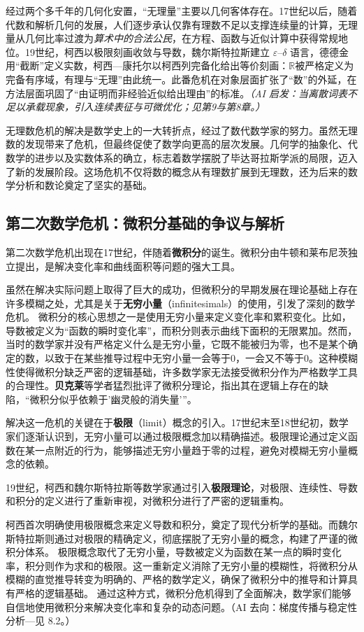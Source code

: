 经过两个多千年的几何化安置，“无理量”主要以几何客体存在。17世纪以后，随着代数和解析几何的发展，人们逐步承认仅靠有理数不足以支撑连续量的计算，无理量从几何比率过渡为{\itshape 算术中的合法公民}，在方程、函数与近似计算中获得常规地位。19世纪，柯西以极限刻画收敛与导数，魏尔斯特拉斯建立 $\varepsilon$–$\delta$ 语言，德德金用“截断”定义实数，柯西—康托尔以柯西列完备化给出等价刻画：$\mathbb{R}$被严格定义为完备有序域，有理与“无理”由此统一。此番危机在对象层面扩张了“数”的外延，在方法层面巩固了“由证明而非经验近似给出理由”的标准。{\itshape（AI 启发：当离散词表不足以承载现象，引入连续表征与可微优化；见第9与第8章。）}

无理数危机的解决是数学史上的一大转折点，经过了数代数学家的努力。虽然无理数的发现带来了危机，但最终促使了数学向更高的层次发展。几何学的抽象化、代数学的进步以及实数体系的确立，标志着数学摆脱了毕达哥拉斯学派的局限，迈入了新的发展阶段。这场危机不仅将数的概念从有理数扩展到无理数，还为后来的数学分析和数论奠定了坚实的基础。

\subsection{第二次数学危机：微积分基础的争议与解析}
第二次数学危机出现在17世纪，伴随着{\bf 微积分}的诞生。微积分由牛顿和莱布尼茨独立提出，是解决变化率和曲线面积等问题的强大工具。

虽然在解决实际问题上取得了巨大的成功，但微积分的早期发展在理论基础上存在许多模糊之处，尤其是关于{\bf 无穷小量}（infinitesimals）的使用，引发了深刻的数学危机。
微积分的核心思想之一是使用无穷小量来定义变化率和累积变化。比如，导数被定义为“函数的瞬时变化率”，而积分则表示曲线下面积的无限累加。然而，当时的数学家并没有严格定义什么是无穷小量，它既不能被归为零，也不是某个确定的数，以致于在某些推导过程中无穷小量一会等于0，一会又不等于0。这种模糊性使得微积分缺乏严密的逻辑基础，许多数学家无法接受微积分作为严格数学工具的合理性。{\bf 贝克莱}等学者猛烈批评了微积分理论，指出其在逻辑上存在的缺陷，“微积分似乎依赖于'幽灵般的消失量'”。

解决这一危机的关键在于{\bf 极限}（limit）概念的引入。17世纪末至18世纪初，数学家们逐渐认识到，无穷小量可以通过极限概念加以精确描述。极限理论通过定义函数在某一点附近的行为，能够描述无穷小量趋于零的过程，避免对模糊无穷小量概念的依赖。

19世纪，柯西和魏尔斯特拉斯等数学家通过引入{\bf 极限理论}，对极限、连续性、导数和积分的定义进行了重新审视，对微积分进行了严密的逻辑重构。

柯西首次明确使用极限概念来定义导数和积分，奠定了现代分析学的基础。而魏尔斯特拉斯则通过对极限的精确定义，彻底摆脱了无穷小量的概念，构建了严谨的微积分体系。
极限概念取代了无穷小量，导数被定义为函数在某一点的瞬时变化率，积分则作为求和的极限。这一重新定义消除了无穷小量的模糊性，将微积分从模糊的直觉推导转变为明确的、严格的数学定义，确保了微积分中的推导和计算具有严格的逻辑基础。
通过这种方式，微积分危机得到了全面解决，数学家们能够自信地使用微积分来解决变化率和复杂的动态问题。{（AI 去向：梯度传播与稳定性分析—见 8.2。）}

